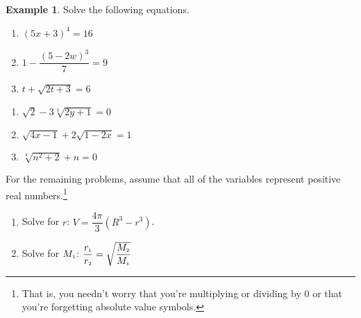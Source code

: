 \documentclass[11pt]{article}
\theoremstyle{definition}  %
\newtheorem{ex}{\bf Example}
\newcounter{HW}
\begin{document}
\begin{ex}\label{radicaleqnreview}  Solve the following equations.


\begin{multicols}{3}
\begin{enumerate}


\item  $(5x +3)^{4} = 16$

\item  $1 - \dfrac{(5-2w)^3}{7} = 9$

\item  $t + \sqrt{2t+3} = 6$


\setcounter{HW}{\value{enumi}}
\end{enumerate}
\end{multicols}

\begin{multicols}{3}
\begin{enumerate}

\setcounter{enumi}{\value{HW}}

\item $\sqrt{2} - 3\sqrt[3]{2y+1} = 0$ 

\item  $\sqrt{4x-1}  + 2\sqrt{1 - 2x} = 1$

\item  $\sqrt[4]{n^2 + 2} + n = 0$

\setcounter{HW}{\value{enumi}}
\end{enumerate}
\end{multicols}

For the remaining problems, assume that all of the variables represent positive real numbers.\footnote{That is, you needn't worry that you're multiplying or dividing by $0$ or that you're forgetting absolute value symbols.}

\begin{multicols}{2}
\begin{enumerate}

\setcounter{enumi}{\value{HW}}

\item  Solve for $r$:  $V = \dfrac{4\pi}{3}(R^3 - r^3)$.
\item  Solve for $M_{\text{\tiny$1$}}$:  $\dfrac{r_{\text{\tiny$1$}}}{r_{\text{\tiny$2$}}} = \sqrt{\dfrac{M_{\text{\tiny$2$}}}{M_{\text{\tiny$1$}}}}$



\end{enumerate}
\end{multicols}
\end{ex}
\end{document}
